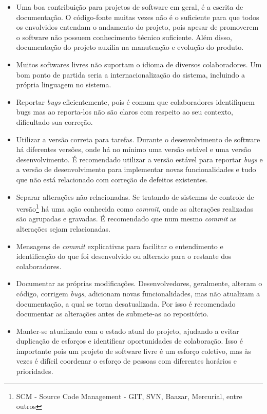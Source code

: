 \begin{itemize}
	\begin{itemize}

		\item Uma boa contribuição para projetos de software em geral, é a escrita de documentação. O código-fonte muitas vezes não é o suficiente para que todos os envolvidos entendam o andamento do projeto, pois apesar de promoverem o software não possuem conhecimento técnico suficiente. Além disso, documentação do projeto auxilia na manutenção e evolução do produto.

		\item Muitos softwares livres não suportam o idioma de diversos colaboradores. Um bom ponto de partida seria a internacionalização do sistema, incluindo a própria linguagem no sistema.

		\item Reportar \textit{bugs} eficientemente, pois é comum que colaboradores identifiquem bugs mas ao reporta-los não são claros com respeito ao seu contexto, dificultado sua correção.

		\item Utilizar a versão correta para tarefas. Durante o desenvolvimento de software há diferentes versões, onde há no mínimo uma versão estável e uma versão desenvolvimento. É recomendado utilizar a versão estável para reportar \textit{bugs} e a versão de desenvolvimento para implementar novas funcionalidades e tudo que não está relacionado com correção de defeitos existentes.

		\item Separar alterações não relacionadas. Se tratando de sistemas de controle de versão\footnote{SCM - Source Code Management - GIT, SVN, Baazar, Mercurial, entre outros} há uma ação conhecida como \textit{commit}, onde as alterações realizadas são agrupadas e gravadas. É recomendado que num mesmo \textit{commit} as alterações sejam relacionadas.

		\item Mensagens de \textit{commit} explicativas para facilitar o entendimento e identificação do que foi desenvolvido ou alterado para o restante dos colaboradores.

		\item Documentar as próprias modificações. Desenvolvedores, geralmente, alteram o código, corrigem \textit{bugs}, adicionam novas funcionalidades, mas não atualizam a documentação, a qual se torna desatualizada. Por isso é recomendado documentar as alterações antes de submete-as ao repositório.

		\item Manter-se atualizado com o estado atual do projeto, ajudando a evitar duplicação de esforços e identificar oportunidades de colaboração. Isso é importante pois um projeto de software livre é um esforço coletivo, mas às vezes é difícil coordenar o esforço de pessoas com diferentes horários e prioridades.

	\end{itemize}

\end{itemize}

